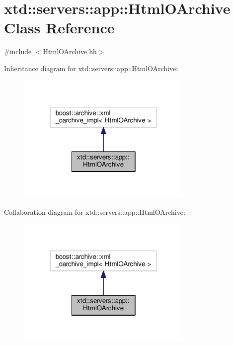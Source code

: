 \hypertarget{classxtd_1_1servers_1_1app_1_1HtmlOArchive}{}\section{xtd\+:\+:servers\+:\+:app\+:\+:Html\+O\+Archive Class Reference}
\label{classxtd_1_1servers_1_1app_1_1HtmlOArchive}


{\ttfamily \#include $<$Html\+O\+Archive.\+hh$>$}



Inheritance diagram for xtd\+:\+:servers\+:\+:app\+:\+:Html\+O\+Archive\+:
\nopagebreak
\begin{figure}[H]
\begin{center}
\leavevmode
\includegraphics[width=241pt]{classxtd_1_1servers_1_1app_1_1HtmlOArchive__inherit__graph}
\end{center}
\end{figure}


Collaboration diagram for xtd\+:\+:servers\+:\+:app\+:\+:Html\+O\+Archive\+:
\nopagebreak
\begin{figure}[H]
\begin{center}
\leavevmode
\includegraphics[width=241pt]{classxtd_1_1servers_1_1app_1_1HtmlOArchive__coll__graph}
\end{center}
\end{figure}

